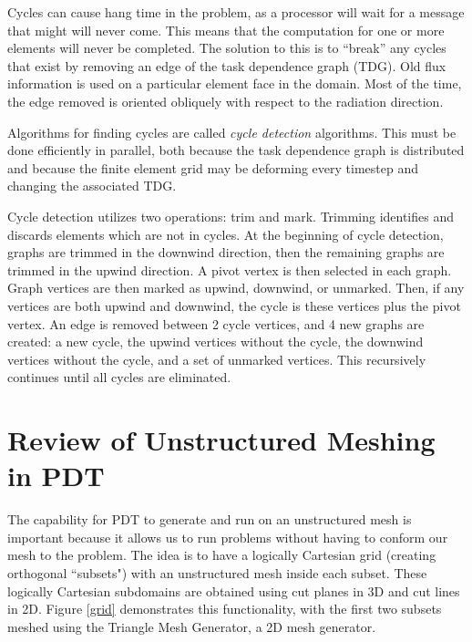 \documentclass[11pt, letterpaper,titlepage,oneside]{article}
\begin{document}
Cycles can cause hang time in the problem, as a processor will wait for a message that might will never come. This means that the computation for one or more elements will never be completed. The solution to this is to ``break'' any cycles that exist by removing an edge of the task dependence graph (TDG). Old flux information is used on a particular element face in the domain. Most of the time, the edge removed is oriented obliquely with respect to the radiation direction. 

Algorithms for finding cycles are called \textit{cycle detection} algorithms. This must be done efficiently in parallel, both because the task dependence graph is distributed and because the finite element grid may be deforming every timestep and changing the associated TDG.

Cycle detection utilizes two operations: trim and mark. Trimming identifies and discards elements which are not in cycles. At the beginning of cycle detection, graphs are trimmed in the downwind direction, then the remaining graphs are trimmed in the upwind direction. A pivot vertex is then selected in each graph. Graph vertices are then marked as upwind, downwind, or unmarked. Then, if any vertices are both upwind and downwind, the cycle is these vertices plus the pivot vertex. An edge is removed between 2 cycle vertices, and 4 new graphs are created: a new cycle, the upwind vertices without the cycle, the downwind vertices without the cycle, and a set of unmarked vertices. This recursively continues until all cycles are eliminated.

\section{Review of Unstructured Meshing in PDT}

The capability for PDT to generate and run on an unstructured mesh is important because it allows us to run problems without having to conform our mesh to the problem. The idea is to have a logically Cartesian grid (creating orthogonal ``subsets") with an unstructured mesh inside each subset. These logically Cartesian subdomains are obtained using cut planes in 3D and cut lines in 2D. Figure \ref{grid} demonstrates this functionality, with the first two subsets meshed using the Triangle Mesh Generator\cite{triangle}, a 2D mesh generator. 
\end{document}
